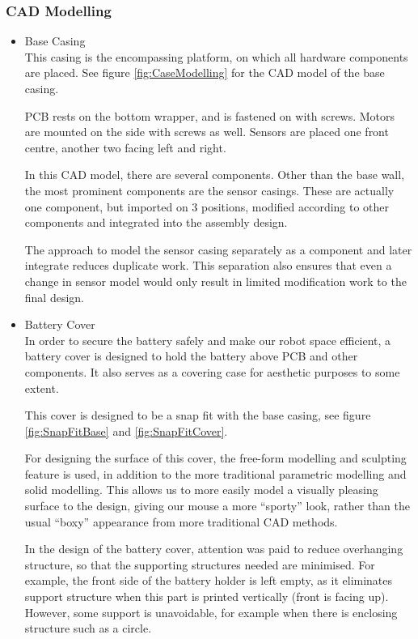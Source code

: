 \subsubsection{CAD Modelling}
\begin{itemize}
    \item Base Casing\\ 
    This casing is the encompassing platform, on which all hardware components are placed. See figure \ref{fig:CaseModelling} for the CAD model of the base casing.

    PCB rests on the bottom wrapper, and is fastened on with screws. Motors are mounted on the side with screws as well. Sensors are placed one front centre, another two facing left and right.

    In this CAD model, there are several components. Other than the base wall, the most prominent components are the sensor casings. These are actually one component, but imported on 3 positions, modified according to other components and integrated into the assembly design. 

    The approach to model the sensor casing separately as a component and later integrate reduces duplicate work. This separation also ensures that even a change in sensor model would only result in limited modification work to the final design.
    

    \item Battery Cover\\ 
    In order to secure the battery safely and make our robot space efficient, a battery cover is designed to hold the battery above PCB and other components. It also serves as a covering case for aesthetic purposes to some extent.

    This cover is designed to be a snap fit with the base casing, see figure \ref{fig:SnapFitBase} and \ref{fig:SnapFitCover}.

    For designing the surface of this cover, the free-form modelling and sculpting feature is used, in addition to the more traditional parametric modelling and solid modelling. This allows us to more easily model a visually pleasing surface to the design, giving our mouse a more “sporty” look, rather than the usual “boxy” appearance from more traditional CAD methods.

    In the design of the battery cover, attention was paid to reduce overhanging structure, so that the supporting structures needed are minimised. For example, the front side of the battery holder is left empty, as it eliminates support structure when this part is printed vertically (front is facing up). However, some support is unavoidable, for example when there is enclosing structure such as a circle.

\end{itemize}

